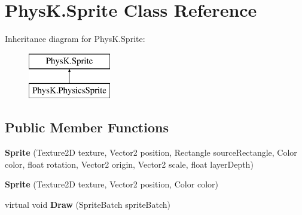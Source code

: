 \hypertarget{class_phys_k_1_1_sprite}{}\section{Phys\+K.\+Sprite Class Reference}
\label{class_phys_k_1_1_sprite}
Inheritance diagram for Phys\+K.\+Sprite\+:\begin{figure}[H]
\begin{center}
\leavevmode
\includegraphics[height=2.000000cm]{class_phys_k_1_1_sprite}
\end{center}
\end{figure}
\subsection*{Public Member Functions}
\begin{DoxyCompactItemize}
\item 
{\bfseries Sprite} (Texture2D texture, Vector2 position, Rectangle source\+Rectangle, Color color, float rotation, Vector2 origin, Vector2 scale, float layer\+Depth)\hypertarget{class_phys_k_1_1_sprite_a06eb35aaa1194dd46b7aaf580f1cd867}{}\label{class_phys_k_1_1_sprite_a06eb35aaa1194dd46b7aaf580f1cd867}

\item 
{\bfseries Sprite} (Texture2D texture, Vector2 position, Color color)\hypertarget{class_phys_k_1_1_sprite_acd414c011a44f85b6dc03a4c0f876ba0}{}\label{class_phys_k_1_1_sprite_acd414c011a44f85b6dc03a4c0f876ba0}

\item 
virtual void {\bfseries Draw} (Sprite\+Batch sprite\+Batch)\hypertarget{class_phys_k_1_1_sprite_aef86d663292d353f0b76b6623102e07b}{}\label{class_phys_k_1_1_sprite_aef86d663292d353f0b76b6623102e07b}

\end{DoxyCompactItemize}
